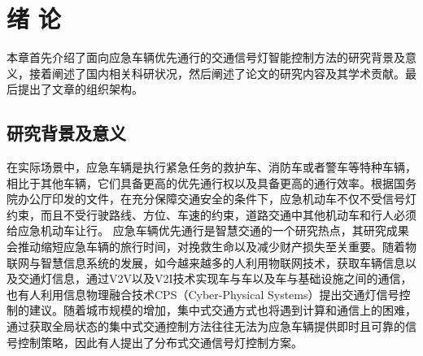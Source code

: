 \chapter{绪\hskip 0.4cm 论}
\label{chap1}
本章首先介绍了面向应急车辆优先通行的交通信号灯智能控制方法的研究背景及意义，接着阐述了国内相关科研状况，然后阐述了论文的研究内容及其学术贡献。最后提出了文章的组织架构。


\section{研究背景及意义}
在实际场景中，应急车辆是执行紧急任务的救护车、消防车或者警车等特种车辆，相比于其他车辆，它们具备更高的优先通行权以及具备更高的通行效率。根据国务院办公厅印发的文件，在充分保障交通安全的条件下，应急机动车不仅不受信号灯约束，而且不受行驶路线、方位、车速的约束，道路交通中其他机动车和行人必须给应急机动车让行\cite{chinaInfo}。 应急车辆优先通行是智慧交通的一个研究热点\cite{ITS_in_China, wulibin_vanet}，其研究成果会推动缩短应急车辆的旅行时间，对挽救生命以及减少财产损失至关重要。随着物联网与智慧信息系统的发展，如今越来越多的人利用物联网技术，获取车辆信息以及交通灯信息\cite{chenhongyu,0TRAFFIC}，通过V2V以及V2I技术实现车与车以及车与基础设施之间的通信\cite{nguyen2019combining, lijinyang, Oza_2020}，也有人利用信息物理融合技术CPS（Cyber-Physical  Systems）提出交通灯信号控制的建议\cite{chang2020cps}。随着城市规模的增加，集中式交通方式也将遇到计算和通信上的困难，通过获取全局状态的集中式交通控制方法往往无法为应急车辆提供即时且可靠的信号控制策略，因此有人提出了分布式交通信号灯控制方案\cite{xuyang}。


